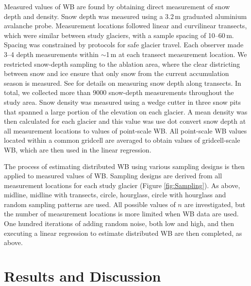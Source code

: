\documentclass[twocolumn,letterpaper]{igs}
\begin{document}
Measured values of WB are found by obtaining direct measurement of snow depth and density. Snow depth was measured using a 3.2\,m graduated aluminium avalanche probe. Measurement locations followed linear and curvilinear transects, which were similar between study glaciers, with a sample spacing of 10--60\,m.  Spacing was constrained by protocols for safe glacier travel. Each observer made 3--4 depth measurements within $\sim$1\,m at each transect measurement location. We restricted snow-depth sampling to the ablation area, where the clear districting between snow and ice ensure that only snow from the current accumulation season is measured. See \cite{Pulwicki2017} for details on measuring snow depth along transects. In total, we collected more than 9000 snow-depth measurements throughout the study area. Snow density was measured using a wedge cutter in three snow pits that spanned a large portion of the elevation on each glacier. A mean density was then calculated for each glacier and this value was use dot convert snow depth at all measurement locations to values of point-scale WB. All point-scale WB values located within a common gridcell are averaged to obtain values of gridcell-scale WB, which are then used in the linear regression. 

The process of estimating distributed WB using various sampling designs is then applied to measured values of WB. Sampling designs are derived from all measurement locations for each study glacier (Figure \ref{fig:Sampling}). As above, midline, midline with transects, circle, hourglass, circle with hourglass and random sampling patterns are used. All possible values of $n$ are investigated, but the number of measurement locations is more limited when WB data are used. One hundred iterations of adding random noise, both low and high, and then executing a linear regression to estimate distributed WB are then completed, as above. 

\section{Results and Discussion}

%
%
%
%
%
%
\end{document}
